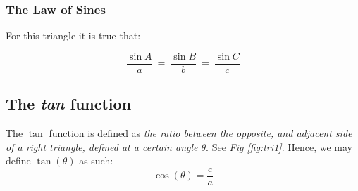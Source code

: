 \documentclass[a4paper, 12pt]{article}
\begin{document}
\subsubsection{The Law of Sines}
\begin{center}
 \bigbreak


For this triangle it is true that:
\end{center}
$$\frac{\sin{A}}{a} \ = \ \frac{\sin{B}}{b} \ = \ \frac{\sin{C}}{c}$$


\bigbreak










		






\subsection{The \emph{tan} function}



The $\tan$ function is defined as \emph{the ratio between the opposite, and adjacent side of a right triangle, defined at a certain angle $\theta$}. See \emph{Fig \ref{fig:tri1}}.
Hence, we may define $\tan(\theta)$ as such: \bigbreak
$$\cos(\theta) = \frac{c}{a}$$
\end{document}
